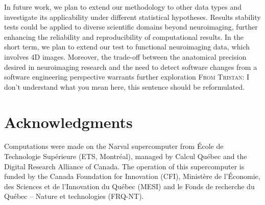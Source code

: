 \documentclass[lettersize,journal]{IEEEtran}
\newcommand{\TG}[1]{\color{orange}\textsc{From Tristan:} #1\color{black}\xspace}
\begin{document}


In future work, we plan to extend our methodology to other data types and investigate its applicability under different statistical hypotheses.
Results stability tests could be applied to diverse scientific domains beyond neuroimaging, further enhancing the reliability and reproducibility of computational results. In the short term, we plan to extend our test to functional neuroimaging data, which involves 4D images. Moreover, the trade-off between the anatomical precision desired in neuroimaging research and the need to detect software changes from a software engineering perspective warrants further exploration \TG{I don't understand what you mean here, this sentence should be reformulated}.

\section*{Acknowledgments}

Computations were made on the Narval supercomputer from \'Ecole de Technologie
Sup\'erieure (ETS, Montr\'eal), managed by Calcul Québec and the Digital Research Alliance of Canada. The
operation of this supercomputer is funded by the Canada Foundation for
Innovation (CFI), Ministère de l’Économie, des Sciences et de l’Innovation du
Québec (MESI) and le Fonds de recherche du Québec – Nature et technologies
(FRQ-NT).
\end{document}
